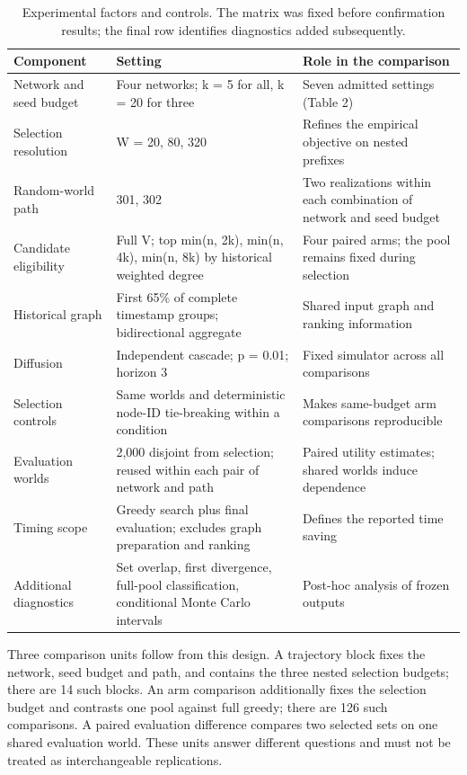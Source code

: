 \documentclass[smallextended]{svjour3}
\begin{document}
\begin{table}[tbp]
\caption{Experimental factors and controls. The matrix was fixed before confirmation results; the final row identifies diagnostics added subsequently.}
\label{tab:3}
\begin{tabularx}{\linewidth}{@{}L{.23\linewidth}L{.34\linewidth}Y@{}}
\toprule
\textbf{Component} & \textbf{Setting} & \textbf{Role in the comparison} \\
\midrule
Network and seed budget & Four networks; k = 5 for all, k = 20 for three & Seven admitted settings (Table 2) \\
Selection resolution & W = 20, 80, 320 & Refines the empirical objective on nested prefixes \\
Random-world path & 301, 302 & Two realizations within each combination of network and seed budget \\
Candidate eligibility & Full V; top min(n, 2k), min(n, 4k), min(n, 8k) by historical weighted degree & Four paired arms; the pool remains fixed during selection \\
Historical graph & First 65\% of complete timestamp groups; bidirectional aggregate & Shared input graph and ranking information \\
Diffusion & Independent cascade; p = 0.01; horizon 3 & Fixed simulator across all comparisons \\
Selection controls & Same worlds and deterministic node-ID tie-breaking within a condition & Makes same-budget arm comparisons reproducible \\
Evaluation worlds & 2,000 disjoint from selection; reused within each pair of network and path & Paired utility estimates; shared worlds induce dependence \\
Timing scope & Greedy search plus final evaluation; excludes graph preparation and ranking & Defines the reported time saving \\
Additional diagnostics & Set overlap, first divergence, full-pool classification, conditional Monte Carlo intervals & Post-hoc analysis of frozen outputs \\
\bottomrule
\end{tabularx}
\end{table}

Three comparison units follow from this design. A trajectory block fixes the network, seed budget and path, and contains the three nested selection budgets; there are 14 such blocks. An arm comparison additionally fixes the selection budget and contrasts one pool against full greedy; there are 126 such comparisons. A paired evaluation difference compares two selected sets on one shared evaluation world. These units answer different questions and must not be treated as interchangeable replications.
\end{document}
